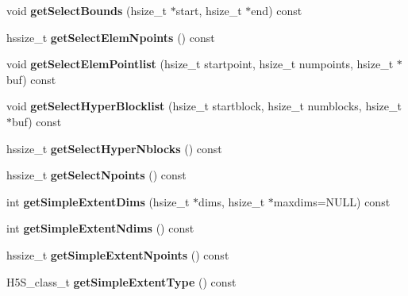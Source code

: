 \begin{DoxyCompactItemize}
void {\bfseries get\+Select\+Bounds} (hsize\+\_\+t $\ast$start, hsize\+\_\+t $\ast$end) const
\item 
\mbox{\label{class_h5_1_1_data_space_adf9fc83bb5ddb02012b01a387fe54361}} 
hssize\+\_\+t {\bfseries get\+Select\+Elem\+Npoints} () const
\item 
\mbox{\label{class_h5_1_1_data_space_af77de3b28ddc261a3e906519e87a9f2a}} 
void {\bfseries get\+Select\+Elem\+Pointlist} (hsize\+\_\+t startpoint, hsize\+\_\+t numpoints, hsize\+\_\+t $\ast$buf) const
\item 
\mbox{\label{class_h5_1_1_data_space_ad113c8fff065e490347f509f1c2bd9ac}} 
void {\bfseries get\+Select\+Hyper\+Blocklist} (hsize\+\_\+t startblock, hsize\+\_\+t numblocks, hsize\+\_\+t $\ast$buf) const
\item 
\mbox{\label{class_h5_1_1_data_space_a3132ad36aab6dd71b2005a125a51e320}} 
hssize\+\_\+t {\bfseries get\+Select\+Hyper\+Nblocks} () const
\item 
\mbox{\label{class_h5_1_1_data_space_af9c47e6c67444d332acd6955375df5b1}} 
hssize\+\_\+t {\bfseries get\+Select\+Npoints} () const
\item 
\mbox{\label{class_h5_1_1_data_space_a94422ac0835aa150c38f6dd1433996ef}} 
int {\bfseries get\+Simple\+Extent\+Dims} (hsize\+\_\+t $\ast$dims, hsize\+\_\+t $\ast$maxdims=N\+U\+LL) const
\item 
\mbox{\label{class_h5_1_1_data_space_af3d8db42fd70451898c5928d02e124a5}} 
int {\bfseries get\+Simple\+Extent\+Ndims} () const
\item 
\mbox{\label{class_h5_1_1_data_space_a1e3022199d797713c55614ccad1edaf5}} 
hssize\+\_\+t {\bfseries get\+Simple\+Extent\+Npoints} () const
\item 
\mbox{\label{class_h5_1_1_data_space_ae6309c628a87887e1df4c0655a651436}} 
H5\+S\+\_\+class\+\_\+t {\bfseries get\+Simple\+Extent\+Type} () const
\item 

\end{DoxyCompactItemize}
